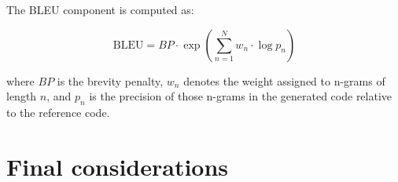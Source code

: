 The BLEU component is computed as:

\begin{equation}
    \text{BLEU} = BP \cdot \exp\left(\sum_{n=1}^{N} w_n \cdot \log p_n\right)
\end{equation}

where \(BP\) is the brevity penalty, \(w_n\) denotes the weight assigned to n-grams of length \(n\), and \(p_n\) is the precision of those n-grams in the generated code relative to the reference code.












\section{Final considerations}

